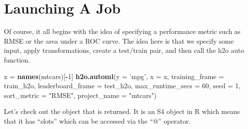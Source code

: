 \documentclass[
]{book}
\newenvironment{Shaded}{\begin{snugshade}}{\end{snugshade}}
\newcommand{\DataTypeTok}[1]{\textcolor[rgb]{0.13,0.29,0.53}{#1}}
\newcommand{\DecValTok}[1]{\textcolor[rgb]{0.00,0.00,0.81}{#1}}
\newcommand{\KeywordTok}[1]{\textcolor[rgb]{0.13,0.29,0.53}{\textbf{#1}}}
\newcommand{\NormalTok}[1]{#1}
\newcommand{\OperatorTok}[1]{\textcolor[rgb]{0.81,0.36,0.00}{\textbf{#1}}}
\newcommand{\StringTok}[1]{\textcolor[rgb]{0.31,0.60,0.02}{#1}}
\begin{document}
\hypertarget{launching-a-job}{%
\section{Launching A Job}\label{launching-a-job}}

Of course, it all begins with the idea of specifying a performance metric such as RMSE or the area under a ROC curve. The idea here is that we specify some input, apply transformations, create a test/train pair, and then call the h2o auto function.

\begin{Shaded}
\begin{Highlighting}[]
\NormalTok{x =}\StringTok{ }\KeywordTok{names}\NormalTok{(mtcars)[}\OperatorTok{-}\DecValTok{1}\NormalTok{]}
\KeywordTok{h2o.automl}\NormalTok{(}\DataTypeTok{y =} \StringTok{'mpg'}\NormalTok{, }\DataTypeTok{x =}\NormalTok{ x,}
                      \DataTypeTok{training_frame =}\NormalTok{ train_h2o,}
                      \DataTypeTok{leaderboard_frame =}\NormalTok{ test_h2o,}
                      \DataTypeTok{max_runtime_secs =} \DecValTok{60}\NormalTok{,}
                      \DataTypeTok{seed =} \DecValTok{1}\NormalTok{,}
                      \DataTypeTok{sort_metric =} \StringTok{"RMSE"}\NormalTok{,}
                      \DataTypeTok{project_name =} \StringTok{"mtcars"}\NormalTok{)}
\end{Highlighting}
\end{Shaded}

Let's check out the object that is returned. It is an S4 object in R which means that it has ``slots'' which can be accessed via the ``@'' operator.
\end{document}
